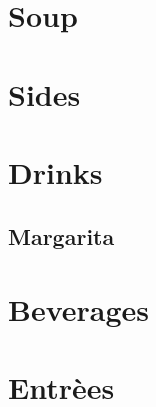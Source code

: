 \documentclass{family_cookbook}
\begin{document}
\chapter{Soup}
\minitoc
\clearpage






\chapter{Sides}
\minitoc
\clearpage




\chapter{Drinks}
\minitoc
\clearpage


\section{Margarita}
{
	\let\section\subsection
	\let\subsection\subsubsection
	
	
}





\chapter{Beverages}
\minitoc
\clearpage



\chapter{Entr\`{e}es}
\minitoc
\clearpage









\end{document}
